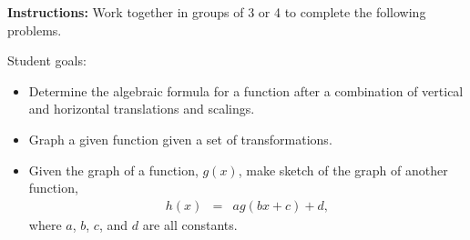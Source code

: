 



\noindent \textbf{Instructions:}  Work together in groups of  3 or 4 to complete the following problems.

\noindent
Student goals:
\begin{itemize}
\item Determine the algebraic formula for a function after a
  combination of vertical and horizontal translations and scalings.
\item Graph a given function given a set of transformations.
\item Given the graph of a function, $g(x)$, make sketch of the graph
  of another function,
  \begin{eqnarray*}
    h(x) & = & a g(bx+c)+d,
  \end{eqnarray*}
  where $a$, $b$, $c$, and $d$ are all constants.
\end{itemize}





